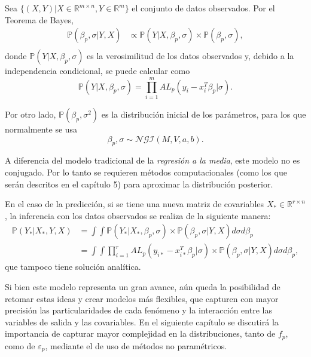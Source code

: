 Sea $\{(X,Y) | X \in \mathbb{R}^{m \times n}, Y \in \mathbb{R}^m\}$ el conjunto de datos observados. Por el Teorema de Bayes,
\begin{equation*}
\begin{aligned}
    \mathbb{P}(\beta_p,\sigma | Y, X) 
    &\propto \mathbb{P}(Y| X, \beta_p, \sigma) \times \mathbb{P}(\beta_p, \sigma), \\
\end{aligned}
\end{equation*}
donde $\mathbb{P}(Y| X, \beta_p, \sigma)$ es la verosimilitud de los datos observados y, debido a la independencia condicional, se puede calcular como 
\begin{equation*}
    \mathbb{P}(Y| X, \beta_p, \sigma)
    =
    \prod_{i=1}^m AL_p(y_i - x_i^T\beta_p|\sigma).
\end{equation*}

Por otro lado, $\mathbb{P}(\beta_p,\sigma^2)$ es la distribuci\'on inicial de los par\'ametros, para los que normalmente se usa
\begin{equation*}
    \beta_p,\sigma \sim \mathcal{NGI}(M,V,a,b). 
\end{equation*}

A diferencia del modelo tradicional de la \textit{regresi\'on a la media}, este modelo no es conjugado. Por lo tanto se requieren m\'etodos computacionales (como los que ser\'an descritos en el cap\'itulo 5) para aproximar la distribuci\'on posterior.

En el caso de la predicci\'on, si se tiene una nueva matriz de covariables $X_* \in \mathbb{R}^{r \times n}$, la inferencia con los datos observados se realiza de la siguiente manera:
\begin{equation*}
\begin{aligned}
    \mathbb{P}(Y_*|X_*,Y,X)
    &= \int \int \mathbb{P}(Y_*|X_*,\beta_p,\sigma) \times \mathbb{P}(\beta_p,\sigma|Y,X) d\sigma d\beta_p \\
    &= \int \int \prod_{i=1}^r AL_p(y_{i*} - x_{i*}^T\beta_p|\sigma) \times \mathbb{P}(\beta_p,\sigma|Y,X) d\sigma d\beta_p,
\end{aligned}
\end{equation*}
que tampoco tiene soluci\'on anal\'itica.

Si bien este modelo representa un gran avance, a\'un queda la posibilidad de retomar estas ideas y crear modelos m\'as flexibles, que capturen con mayor precisi\'on las particularidades de cada fen\'omeno y la interacci\'on entre las variables de salida y las covariables. En el siguiente cap\'itulo se discutir\'a la importancia de capturar mayor complejidad en la distribuciones, tanto de $f_p$, como de $\varepsilon_p$, mediante el de uso de m\'etodos no param\'etricos.